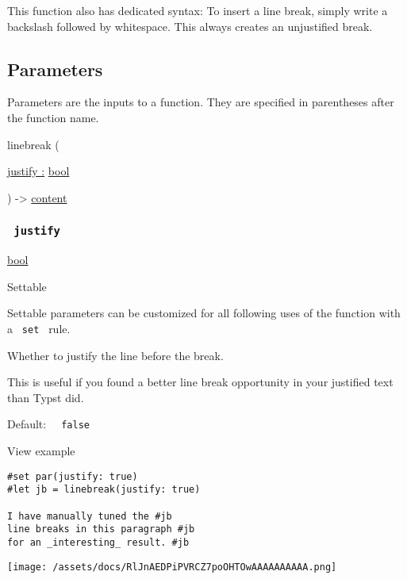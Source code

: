 This function also has dedicated syntax: To insert a line break, simply
write a backslash followed by whitespace. This always creates an
unjustified break.

\subsection{\texorpdfstring{{ Parameters
}}{ Parameters }}\label{parameters}

\label{parameters-tooltip}
Parameters are the inputs to a function. They are specified in
parentheses after the function name.

{ linebreak } (

{ \hyperref[parameters-justify]{justify :}
\href{/docs/reference/foundations/bool/}{bool} }

) -\textgreater{} \href{/docs/reference/foundations/content/}{content}

\subsubsection{\texorpdfstring{\texttt{\ justify\ }}{ justify }}\label{parameters-justify}

\href{/docs/reference/foundations/bool/}{bool}

{{ Settable }}

\label{parameters-justify-settable-tooltip}
Settable parameters can be customized for all following uses of the
function with a \texttt{\ set\ } rule.

Whether to justify the line before the break.

This is useful if you found a better line break opportunity in your
justified text than Typst did.

Default: \texttt{\ }{\texttt{\ false\ }}\texttt{\ }


View example

\begin{verbatim}
#set par(justify: true)
#let jb = linebreak(justify: true)

I have manually tuned the #jb
line breaks in this paragraph #jb
for an _interesting_ result. #jb
\end{verbatim}

\texttt{[image: /assets/docs/RlJnAEDPiPVRCZ7poOHTOwAAAAAAAAAA.png]}

\href{/docs/reference/text/highlight/}{\pandocbounded{}}

